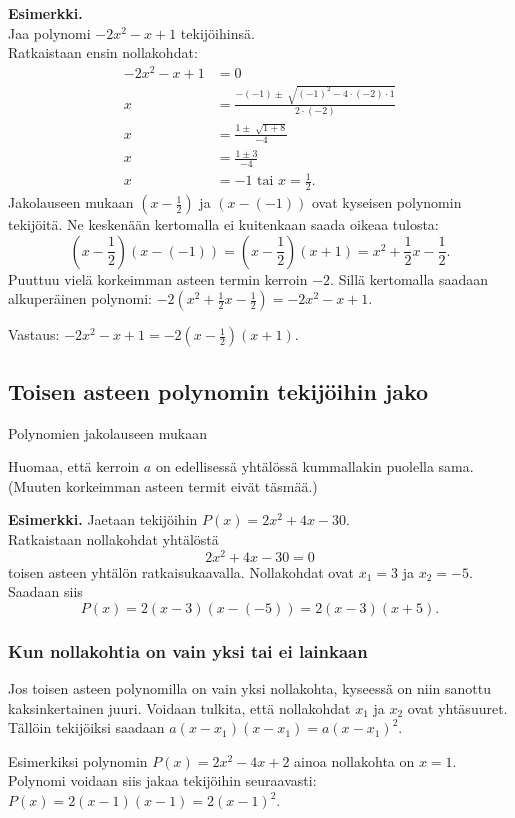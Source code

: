 \textbf{Esimerkki.} \\
Jaa polynomi $-2x^2-x+1$ tekijöihinsä.\\
Ratkaistaan ensin nollakohdat:
\begin{align*}
-2x^2-x+1&=0 \\
x&=\frac{-(-1) \pm \sqrt[]{(-1)^2-4 \cdot (-2) \cdot 1}}{2 \cdot (-2)} \\
x&=\frac{1 \pm \sqrt[]{1+8}}{-4} \\
x&=\frac{1 \pm 3}{-4} \\
x&=-1 \textrm{ tai } x = \frac{1}{2}.
\end{align*}
Jakolauseen mukaan $(x-\frac{1}{2})$ ja $(x-(-1))$ ovat kyseisen polynomin tekijöitä.
Ne keskenään kertomalla ei kuitenkaan saada oikeaa tulosta:
$$\left(x-\frac{1}{2}\right)(x-(-1))=\left(x-\frac{1}{2}\right)(x+1)=x^2+\frac{1}{2}x-\frac{1}{2}.$$
Puuttuu vielä korkeimman asteen termin kerroin $-2$. Sillä kertomalla saadaan alkuperäinen polynomi:
$-2(x^2+\frac{1}{2}x-\frac{1}{2})=-2x^2-x+1$.

Vastaus: $-2x^2-x+1 = -2(x-\frac{1}{2})(x+1)$.

\subsection*{Toisen asteen polynomin tekijöihin jako}

Polynomien jakolauseen mukaan

Huomaa, että kerroin $a$ on edellisessä yhtälössä kummallakin puolella sama.
(Muuten korkeimman asteen termit eivät täsmää.)

\textbf{Esimerkki.}
Jaetaan tekijöihin $P(x)=2x^2 + 4x-30$. \\
Ratkaistaan nollakohdat yhtälöstä $$2x^2 + 4x-30=0$$ toisen asteen yhtälön ratkaisukaavalla.
Nollakohdat ovat $x_1=3$ ja $x_2=-5$. Saadaan siis
$$P(x)= 2(x-3)(x-(-5)) = 2(x-3)(x+5).$$

\subsubsection*{Kun nollakohtia on vain yksi tai ei lainkaan}
Jos toisen asteen polynomilla on vain yksi nollakohta, kyseessä on niin sanottu kaksinkertainen juuri. Voidaan tulkita, että nollakohdat $x_1$ ja $x_2$ ovat yhtäsuuret. Tällöin tekijöiksi saadaan $a(x-x_1)(x-x_1)=a(x-x_1)^2$.

Esimerkiksi polynomin $P(x)=2x^2-4x+2$ ainoa nollakohta on $x=1$. Polynomi voidaan siis jakaa tekijöihin seuraavasti: \\ $P(x)=2(x-1)(x-1)=2(x-1)^2$. \\

